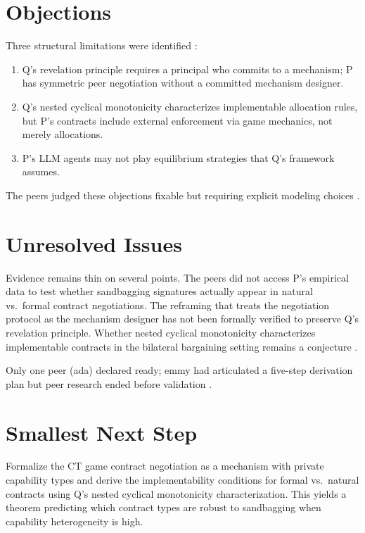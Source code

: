 \documentclass{article}
\begin{document}
\section*{Objections}

Three structural limitations were identified :
\begin{enumerate}
    \item Q's revelation principle requires a principal who commits to a mechanism; P has symmetric peer negotiation without a committed mechanism designer.
    \item Q's nested cyclical monotonicity characterizes implementable allocation rules, but P's contracts include external enforcement via game mechanics, not merely allocations.
    \item P's LLM agents may not play equilibrium strategies that Q's framework assumes.
\end{enumerate}

The peers judged these objections fixable but requiring explicit modeling choices .

\section*{Unresolved Issues}

Evidence remains thin on several points. The peers did not access P's empirical data to test whether sandbagging signatures actually appear in natural vs.\ formal contract negotiations. The reframing that treats the negotiation protocol as the mechanism designer has not been formally verified to preserve Q's revelation principle. Whether nested cyclical monotonicity characterizes implementable contracts in the bilateral bargaining setting remains a conjecture .

Only one peer (ada) declared ready; emmy had articulated a five-step derivation plan but peer research ended before validation .

\section*{Smallest Next Step}

Formalize the CT game contract negotiation as a mechanism with private capability types and derive the implementability conditions for formal vs.\ natural contracts using Q's nested cyclical monotonicity characterization. This yields a theorem predicting which contract types are robust to sandbagging when capability heterogeneity is high.
\end{document}
